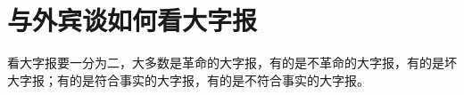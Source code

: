 \section[与外宾谈如何看大字报（一九六七年一月）]{与外宾谈如何看大字报}


看大字报要一分为二，大多数是革命的大字报，有的是不革命的大字报，有的是坏大字报；有的是符合事实的大字报，有的是不符合事实的大字报。


